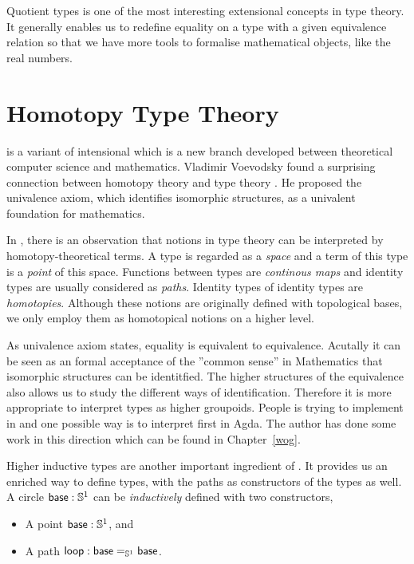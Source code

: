 Quotient types is one of the most interesting extensional concepts in type theory. It generally enables us to redefine equality on a type with a given equivalence relation so that we have more tools to formalise mathematical objects, like the real numbers.


\section{Homotopy Type Theory}

\hott is a variant of intensional \mltt{} which is a new branch developed between theoretical computer science
and mathematics. Vladimir Voevodsky found a surprising connection between homotopy theory and type theory \cite{voe:06}. He proposed the univalence axiom, which identifies isomorphic structures, as a univalent foundation for mathematics. 

In \hott, there is an observation that notions in type theory can be interpreted by homotopy-theoretical terms. A type is regarded as a \emph{space} and a term of this type is a \emph{point} of this space. Functions between types are \emph{continous maps} and identity types are usually considered as \emph{paths}. Identity types of identity types are \emph{homotopies}. Although these notions are originally defined with topological bases, we only employ them as homotopical notions on a higher level. 

As univalence axiom states, equality is equivalent to equivalence. Acutally it can be seen as an formal acceptance of the ''common sense'' in Mathematics that isomorphic structures can be identitfied. The higher structures of the equivalence also allows us to study the different ways of identification. Therefore it is more appropriate to interpret types as higher groupoids. People is trying to implement \hott in \itt and one possible way is to interpret \wog first in Agda. The author has done some work in this direction which can be found in Chapter~\ref{wog}.

Higher inductive types are another important ingredient of \hott. It provides us an enriched way to define types, with the paths as constructors of the types as well. 
A circle $\base:\Sn^1$ can be \emph{inductively} defined with two constructors,
\begin{itemize}
\item A point $\base:\Sn^1$, and
\item A path $\lloop : {\id[\Sn^1]\base\base}$.
\end{itemize}


